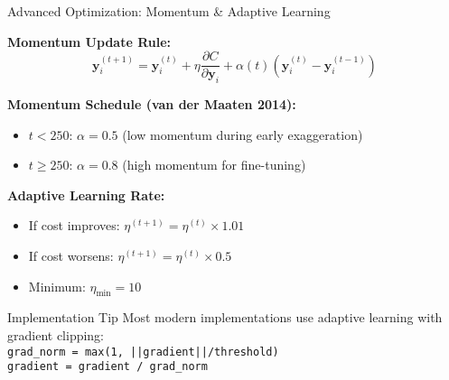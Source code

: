 \documentclass[10pt]{beamer}
\begin{document}
\begin{frame}{Advanced Optimization: Momentum \& Adaptive Learning}

\textbf{Momentum Update Rule:}
\begin{equation}
\mathbf{y}_i^{(t+1)} = \mathbf{y}_i^{(t)} + \eta \frac{\partial C}{\partial \mathbf{y}_i} + \alpha(t)(\mathbf{y}_i^{(t)} - \mathbf{y}_i^{(t-1)})
\end{equation}

\vspace{0.15cm}
\textbf{Momentum Schedule (van der Maaten 2014):}
\begin{itemize}
    \setlength\itemsep{0em}
    \item $t < 250$: $\alpha = 0.5$ (low momentum during early exaggeration)
    \item $t \geq 250$: $\alpha = 0.8$ (high momentum for fine-tuning)
\end{itemize}

\vspace{0.15cm}
\textbf{Adaptive Learning Rate:}
\begin{itemize}
    \setlength\itemsep{0em}
    \item If cost improves: $\eta^{(t+1)} = \eta^{(t)} \times 1.01$
    \item If cost worsens: $\eta^{(t+1)} = \eta^{(t)} \times 0.5$
    \item Minimum: $\eta_{\min} = 10$
\end{itemize}

\vspace{0.15cm}
\begin{exampleblock}{Implementation Tip}
\footnotesize
Most modern implementations use adaptive learning with gradient clipping:\\
\texttt{grad\_norm = max(1, ||gradient||/threshold)}\\
\texttt{gradient = gradient / grad\_norm}
\end{exampleblock}

\end{frame}
\end{document}
